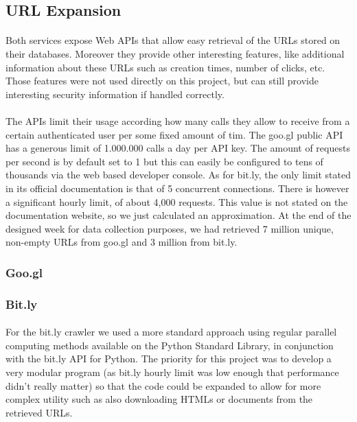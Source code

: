 \documentclass[12pt]{article}
\begin{document}
\subsection{URL Expansion}

\paragraph{}
Both services expose Web APIs that allow easy retrieval of the URLs stored on their databases. Moreover they provide other interesting features, like additional information about these URLs such as creation times, number of clicks, etc. Those features were not used directly on this project, but can still provide interesting security information if handled correctly. 

\paragraph{}
The APIs limit their usage according how many calls they allow to receive from a certain authenticated user per some fixed amount of tim. The goo.gl public API has a generous limit of 1.000.000 calls a day per API key. The amount of requests per second is by default set to 1 but this can easily be configured to tens of thousands via the web based developer console. As for bit.ly, the only limit stated in its official documentation is that of 5 concurrent connections. There is however a significant hourly limit, of  about 4,000 requests. This value is not stated on the documentation website, so we just calculated an approximation. At the end of the designed week for data collection purposes, we had retrieved 7 million unique, non-empty URLs from goo.gl and 3 million from bit.ly.

\subsubsection{Goo.gl}

\subsubsection{Bit.ly}

\paragraph{}
For the bit.ly crawler we used a more standard approach using regular parallel computing methods available on the Python Standard Library, in conjunction with the bit.ly API for Python. The priority for this project was to develop a very modular program (as bit.ly hourly limit was low enough that performance didn't really matter) so that the code could be expanded to allow for more complex utility such as also downloading HTMLs or documents from the retrieved URLs.
\end{document}
